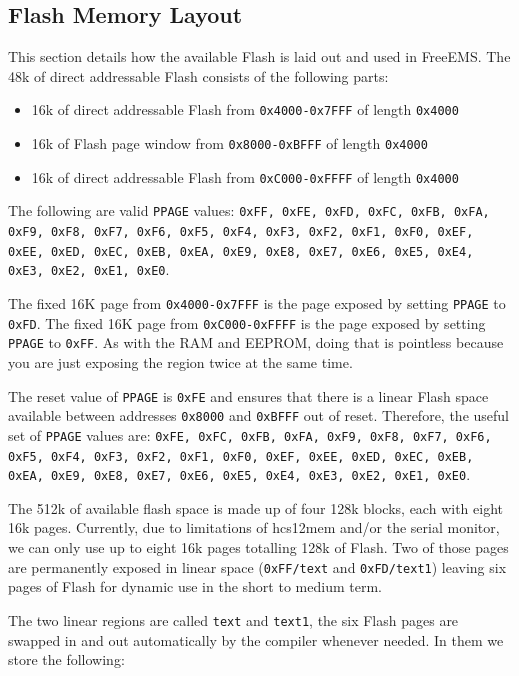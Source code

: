 \documentclass[12pt,a4wide,titlepage]{article}
\begin{document}
\begin{titlepage}
\begin{center}
\section{Flash Memory Layout}

This section details how the available Flash is laid out and used in FreeEMS.
The 48k of direct addressable Flash consists of the following parts:

\begin{itemize}
\item 16k of direct addressable Flash from \texttt{0x4000-0x7FFF} of length \texttt{0x4000}
\item 16k of Flash page window from \texttt{0x8000-0xBFFF} of length \texttt{0x4000}
\item 16k of direct addressable Flash from \texttt{0xC000-0xFFFF} of length \texttt{0x4000}
\end{itemize}

The following are valid \texttt{PPAGE} values: \texttt{0xFF, 0xFE, 0xFD, 0xFC,
0xFB, 0xFA, 0xF9, 0xF8, 0xF7, 0xF6, 0xF5, 0xF4, 0xF3, 0xF2, 0xF1, 0xF0, 0xEF,
0xEE, 0xED, 0xEC, 0xEB, 0xEA, 0xE9, 0xE8, 0xE7, 0xE6, 0xE5, 0xE4, 0xE3, 0xE2,
0xE1, 0xE0}.

The fixed 16K page from \texttt{0x4000-0x7FFF} is the page exposed by setting
\texttt{PPAGE} to \texttt{0xFD}. The fixed 16K page from \texttt{0xC000-0xFFFF}
is the page exposed by setting \texttt{PPAGE} to \texttt{0xFF}. As with the RAM
and EEPROM, doing that is pointless because you are just exposing the region
twice at the same time.

The reset value of \texttt{PPAGE} is \texttt{0xFE} and ensures that there
is a linear Flash space available between addresses \texttt{0x8000} and
\texttt{0xBFFF} out of reset. Therefore, the useful set of \texttt{PPAGE}
values are: \texttt{0xFE, 0xFC, 0xFB, 0xFA, 0xF9, 0xF8, 0xF7, 0xF6, 0xF5, 0xF4,
0xF3, 0xF2, 0xF1, 0xF0, 0xEF, 0xEE, 0xED, 0xEC, 0xEB, 0xEA, 0xE9, 0xE8, 0xE7,
0xE6, 0xE5, 0xE4, 0xE3, 0xE2, 0xE1, 0xE0}.

The 512k of available flash space is made up of four 128k blocks, each with
eight 16k pages. Currently, due to limitations of hcs12mem and/or the serial
monitor, we can only use up to eight 16k pages totalling 128k of Flash. Two of
those pages are permanently exposed in linear space (\texttt{0xFF/text} and
\texttt{0xFD/text1}) leaving six pages of Flash for dynamic use in the short to
medium term.

The two linear regions are called \texttt{text} and \texttt{text1}, the six Flash pages are
swapped in and out automatically by the compiler whenever needed. In them we
store the following:


\end{center}
\end{titlepage}
\end{document}
